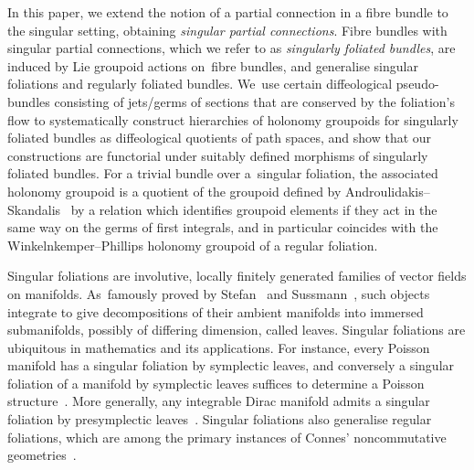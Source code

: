 \documentclass[pdftex]{sigma}
\numberwithin{equation}{section}
\begin{document}
In this paper, we extend the notion of a partial connection in a fibre bundle to the singular setting, obtaining \textit{singular partial connections}. Fibre bundles with singular partial connections, which we refer to as \textit{singularly foliated bundles}, are induced by Lie groupoid actions on~fib\-re bundles, and generalise singular foliations and regularly foliated bundles. We~use certain diffeological pseudo-bundles consisting of jets/germs of sections that are conserved by the foliation's flow to systematically construct hierarchies of holonomy groupoids for singularly foliated bundles as diffeological quotients of path spaces, and show that our constructions are functorial under suitably defined morphisms of singularly foliated bundles. For a trivial bundle over a~singular foliation, the associated holonomy groupoid is a quotient of the groupoid defined by Androulidakis--Skandalis~\cite{iakovos2} by a relation which identifies groupoid elements if they act in the same way on the germs of first integrals, and in particular coincides with the Winkelnkemper--Phillips holonomy groupoid of a regular foliation.

Singular foliations are involutive, locally finitely generated families of vector fields on mani\-folds. As~famously proved by Stefan~\cite{stefan} and Sussmann~\cite{sussmann}, such objects integrate to give decompositions of their ambient manifolds into immersed submanifolds, possibly of differing dimension, called leaves. Singular foliations are ubiquitous in mathematics and its applications. For instance, every Poisson manifold has a singular foliation by symplectic leaves, and conversely a singular foliation of a manifold by symplectic leaves suffices to determine a Poisson structure~\cite{cf1}. More generally, any integrable Dirac manifold admits a singular foliation by presymplectic leaves~\cite{courant}. Singular foliations also generalise regular foliations, which are among the primary instances of Connes' noncommutative geometries~\cite{folops, ncg}.
\end{document}
